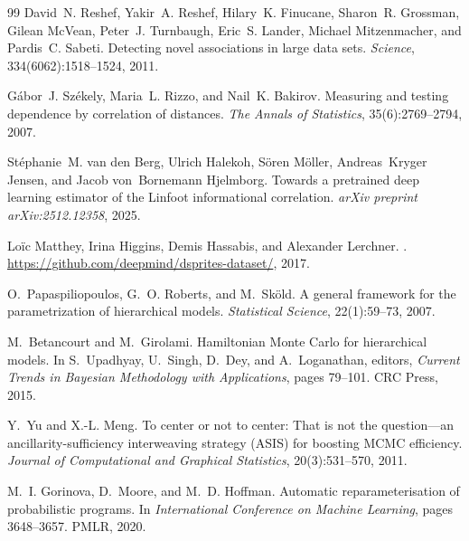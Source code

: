 \documentclass[10pt]{article} %
\theoremstyle{plain}
\theoremstyle{definition}
\begin{document}
\begin{thebibliography}{99}
David~N. Reshef, Yakir~A. Reshef, Hilary~K. Finucane, Sharon~R. Grossman, Gilean McVean, Peter~J. Turnbaugh, Eric~S. Lander, Michael Mitzenmacher, and Pardis~C. Sabeti.
\newblock Detecting novel associations in large data sets.
\newblock \emph{Science}, 334(6062):1518--1524, 2011.

G{\'a}bor~J. Sz{\'e}kely, Maria~L. Rizzo, and Nail~K. Bakirov.
\newblock Measuring and testing dependence by correlation of distances.
\newblock \emph{The Annals of Statistics}, 35(6):2769--2794, 2007.

St{\'e}phanie~M. van den Berg, Ulrich Halekoh, S{\"o}ren M{\"o}ller, Andreas~Kryger Jensen, and Jacob von~Bornemann Hjelmborg.
\newblock Towards a pretrained deep learning estimator of the {Linfoot} informational correlation.
\newblock \emph{arXiv preprint arXiv:2512.12358}, 2025.

Lo{\"i}c Matthey, Irina Higgins, Demis Hassabis, and Alexander Lerchner.
.
\newblock \url{https://github.com/deepmind/dsprites-dataset/}, 2017.

O.~Papaspiliopoulos, G.~O. Roberts, and M.~Sk\"{o}ld.
\newblock A general framework for the parametrization of hierarchical models.
\newblock \emph{Statistical Science}, 22(1):59--73, 2007.

M.~Betancourt and M.~Girolami.
\newblock Hamiltonian {M}onte {C}arlo for hierarchical models.
\newblock In S.~Upadhyay, U.~Singh, D.~Dey, and A.~Loganathan, editors, \emph{Current Trends in Bayesian Methodology with Applications}, pages 79--101. CRC Press, 2015.

Y.~Yu and X.-L. Meng.
\newblock To center or not to center: That is not the question---an ancillarity-sufficiency interweaving strategy ({ASIS}) for boosting {MCMC} efficiency.
\newblock \emph{Journal of Computational and Graphical Statistics}, 20(3):531--570, 2011.

M.~I. Gorinova, D.~Moore, and M.~D. Hoffman.
\newblock Automatic reparameterisation of probabilistic programs.
\newblock In \emph{International Conference on Machine Learning}, pages 3648--3657. PMLR, 2020.

\end{thebibliography}
\end{document}
